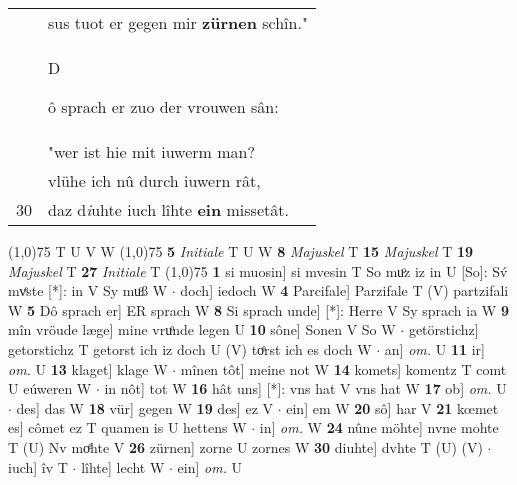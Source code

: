 \documentclass[8pt,a4paper,notitlepage]{article}
\begin{document}
\begin{table}[ht]
\begin{minipage}[t]{0.5\linewidth}
\begin{tabular}{rl}
 & sus tuot er gegen mir \textbf{zürnen} schîn."\\ 
 & \begin{large}D\end{large}ô sprach er zuo der vrouwen sân:\\ 
 & "wer ist hie mit iuwerm man?\\ 
 & vlühe ich nû durch iuwern rât,\\ 
30 & daz d\textit{i}uhte iuch lîhte \textbf{ein} missetât.\\ 
\end{tabular}
\scriptsize
\line(1,0){75} \newline
T U V W \newline
\line(1,0){75} \newline
\textbf{5} \textit{Initiale} T U W  \textbf{8} \textit{Majuskel} T  \textbf{15} \textit{Majuskel} T  \textbf{19} \textit{Majuskel} T  \textbf{27} \textit{Initiale} T  \newline
\line(1,0){75} \newline
\textbf{1} si muosin] si mvesin T So muͦz iz in U [So]: Sv́ mvͤste [*]: in V Sy muͦß W  $\cdot$ doch] iedoch W \textbf{4} Parcifale] Parzifale T (V) partzifali W \textbf{5} Dô sprach er] ER sprach W \textbf{8} Si sprach unde] [*]: Herre V Sy sprach ia W \textbf{9} mîn vröude læge] mine vruͦnde legen U \textbf{10} sône] Sonen V So W  $\cdot$ getörstichz] getorstichz T getorst ich iz doch U (V) toͤrst ich es doch W  $\cdot$ an] \textit{om.} U \textbf{11} ir] \textit{om.} U \textbf{13} klaget] klage W  $\cdot$ mînen tôt] meine not W \textbf{14} komets] komentz T comt U eúweren W  $\cdot$ in nôt] tot W \textbf{16} hât uns] [*]: vns hat V vns hat W \textbf{17} ob] \textit{om.} U  $\cdot$ des] das W \textbf{18} vür] gegen W \textbf{19} des] ez V  $\cdot$ ein] em W \textbf{20} sô] har V \textbf{21} kœmet es] cômet ez T quamen is U hettens W  $\cdot$ in] \textit{om.} W \textbf{24} nûne möhte] nvne mohte T (U) Nv moͤhte V \textbf{26} zürnen] zorne U zornes W \textbf{30} diuhte] dvhte T (U) (V)  $\cdot$ iuch] îv T  $\cdot$ lîhte] lecht W  $\cdot$ ein] \textit{om.} U \newline
\end{minipage}
\end{table}
\end{document}

